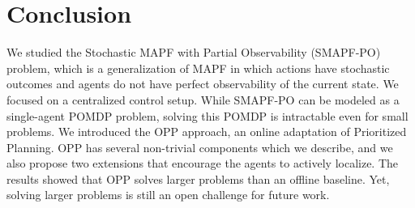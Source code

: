 \documentclass[letterpaper]{article} %
\begin{document}









 
\section{Conclusion}

We studied the Stochastic MAPF with Partial Observability (SMAPF-PO) problem, which is a generalization of MAPF in which actions have stochastic outcomes and agents do not have perfect observability of the current state. We focused on a centralized control setup. While SMAPF-PO can be modeled as a single-agent POMDP problem, solving this POMDP is intractable even for small problems.
We introduced the OPP approach, an online adaptation of Prioritized Planning. OPP has several non-trivial components which we describe, and we also propose two extensions that encourage the agents to actively localize. The results showed that OPP solves larger problems than an offline baseline. 
Yet, solving larger problems is still an open challenge for future work. 







\end{document}
